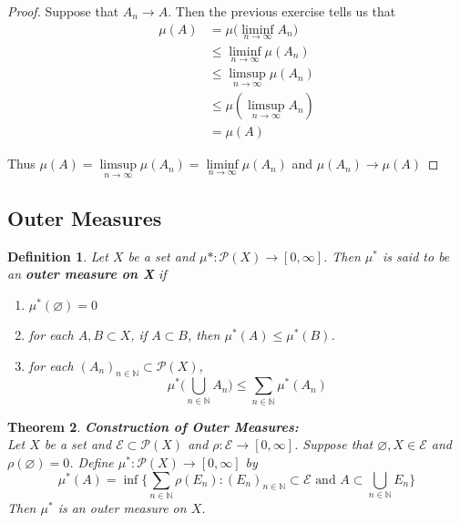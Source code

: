 \documentclass[12pt]{amsart}
\newtheorem{thm}{Theorem}[section]
\newtheorem{defn}[thm]{Definition}
\newcommand{\N}{\mathbb{N}}
\newcommand{\MP}{\mathcal{P}}
\newcommand{\ME}{\mathcal{E}}
\begin{document}
\begin{proof}
Suppose that $A_n \rightarrow A$. Then the previous exercise tells us that 
\begin{align*}
\mu(A)
&= \mu\bigg(\liminf\limits_{n \rightarrow \infty}A_n \bigg)\\
& \leq \liminf_{n \rightarrow \infty} \mu(A_n)\\
& \leq \limsup_{n \rightarrow \infty}\mu (A_n) \\
& \leq \mu( \limsup_{n \rightarrow \infty} A_n) \\
&= \mu (A)
\end{align*}

Thus $\mu(A) = \limsup\limits_{n \rightarrow \infty}\mu(A_n) = \liminf\limits_{n \rightarrow \infty}\mu(A_n)$ and $\mu(A_n) \rightarrow \mu(A)$
\end{proof}


















\subsection{Outer Measures}

\begin{defn}
Let $X$ be a set and $\mu* : \MP(X) \rightarrow [0, \infty]$. Then $\mu^*$ is said to be an \textbf{outer measure on X} if 
\begin{enumerate}
\item $\mu^*(\varnothing) = 0$
\item for each $A,B \subset X $, if $A \subset B$, then $\mu^*(A) \leq \mu^*(B)$.
\item for each $(A_n)_{n \in \N} \subset \MP(X)$, $$\mu^*\big(\bigcup\limits_{n \in \N} A_n\big) \leq \sum\limits_{n \in \N}\mu^*(A_n) $$
\end{enumerate}
\end{defn}

\begin{thm}\textbf{Construction of Outer Measures:} \\
Let $X$ be a set and $\ME \subset \MP(X)$ and $\rho: \ME \rightarrow [0, \infty]$. Suppose that $\varnothing, X \in \ME$ and $\rho(\varnothing) = 0$. Define $\mu^*:\MP(X) \rightarrow [0, \infty]$ by $$\mu^*(A) = \inf \bigg \{\sum_{n \in \N}\rho(E_n): (E_n)_{n \in \N} \subset \ME \text{ and }A \subset \bigcup_{n \in \N}E_n \bigg \}$$ Then $\mu^*$ is an outer measure on $X$.
\end{thm}
\end{document}

